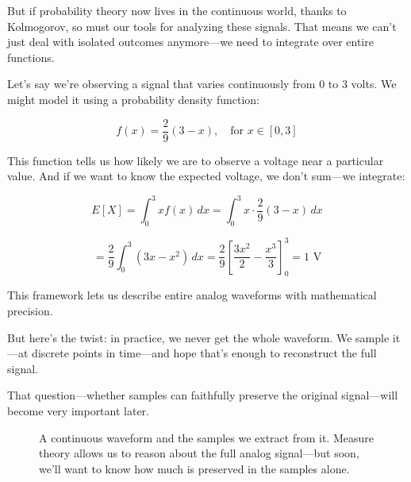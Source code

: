 But if probability theory now lives in the continuous world, thanks to Kolmogorov, so must our tools for analyzing these signals. That means we can’t just deal with isolated outcomes anymore—we need to integrate over entire functions.

Let’s say we’re observing a signal that varies continuously from 0 to 3 volts. We might model it using a probability density function:

\[
f(x) = \frac{2}{9}(3 - x), \quad \text{for } x \in [0, 3]
\]

This function tells us how likely we are to observe a voltage near a particular value. And if we want to know the expected voltage, we don’t sum—we integrate:

\[
E[X] = \int_0^3 x f(x)\,dx = \int_0^3 x \cdot \frac{2}{9}(3 - x)\,dx
\]

\[
= \frac{2}{9} \int_0^3 (3x - x^2)\,dx = \frac{2}{9} \left[ \frac{3x^2}{2} - \frac{x^3}{3} \right]_0^3 = 1 \text{ V}
\]

This framework lets us describe entire analog waveforms with mathematical precision.

But here's the twist: in practice, we never get the whole waveform. We sample it—at discrete points in time—and hope that’s enough to reconstruct the full signal.

That question—whether samples can faithfully preserve the original signal—will become very important later.

\begin{figure}[H]
\centering
{}

\vspace{1em}
\caption{A continuous waveform and the samples we extract from it. Measure theory allows us to reason about the full analog signal—but soon, we’ll want to know how much is preserved in the samples alone.}
\end{figure}



